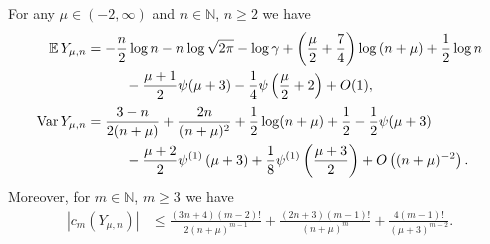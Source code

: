 \documentclass[AHL,Unicode,longabstracts,published]{cedram}
\newcommand{\N}{\mathbb{N}}
\newcommand{\EE}{\mathbb{E}\,}
\newcommand{\Var}{\mathop{\mathrm{Var}}\nolimits}
\begin{document}
\begin{prop}\label{lem:CumulantBounds}
For any $\mu\in(-2,\infty)$ and $n\in\N$, $n\ge 2$ we have
\begin{align*}
\EE Y_{\mu,n}&=-\frac{n}{2}\log n-n\log\sqrt{2\pi}-\log\gamma +\left(\frac{\mu}{2}+\frac{7}{4}\right)\log\left(n+\mu\right)+\frac{1}{2}\log n\\
&\mkern50mu -\frac{\mu+1}{2}\psi(\mu+3)-\frac{1}{4}\psi\left(\frac{\mu}{2}+2\right)+O(1),\\[0.20em]
\Var Y_{\mu,n}&=\frac{3-n}{2(n+\mu)}+\frac{2n}{(n+\mu)^2}+\frac12\log(n+\mu)+\frac{1}{2}-\frac12\psi(\mu+3)\\
&\mkern50mu -\frac{\mu+2}{2}\psi^{(1)}\left(\mu+3\right)+\frac{1}{8}\psi^{(1)}\left(\frac{\mu+3}{2}\right)+O\left((n+\mu)^{-2}\right).
\end{align*}
Moreover, for $m\in\N$, $m\geq 3$ we have
\begin{align*}
\left|c_m(Y_{\mu,n})\right|&\leq\frac{(3n+4)(m-2)!}{2(n+\mu)^{m-1}}+\frac{(2n+3)(m-1)!}{(n+\mu)^{m}}+\frac{4(m-1)!}{(\mu+3)^{m-2}}.
\end{align*}
\end{prop}
\end{document}
